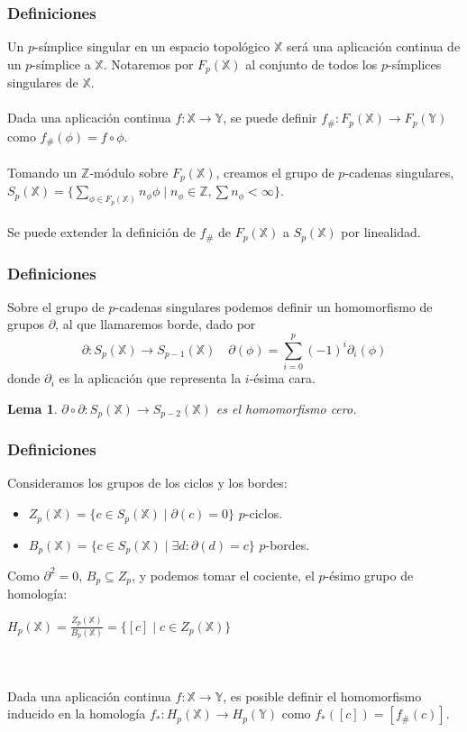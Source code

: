 \documentclass{beamer}
\def\X{{\mathbb X}}
\def\Y{{\mathbb Y}}
\theoremstyle{theorem}
\newtheorem{mylemma}{Lema}
\begin{document}

\begin{frame}
  \frametitle{Definiciones}
  Un $p$-símplice singular en un espacio topológico $\X$ será una aplicación continua de un $p$-símplice a $\X$.
  Notaremos por $F_p(\X)$ al conjunto de todos los $p$-símplices singulares de $\X$. \\~\\

  Dada una aplicación continua $f \colon \X \to \Y$, se puede definir $f_\# \colon F_p(\X) \to F_p(\Y)$ como
  $f_\#(\phi) = f \circ \phi$. \\~\\

  Tomando un $\mathbb{Z}$-módulo sobre $F_p(\X)$, creamos el grupo de $p$-cadenas singulares,
  $S_p(\X) = \{\sum\limits_{\phi \in F_p(\X)} n_{\phi} \phi \mid n_{\phi} \in \mathbb Z,  \sum n_\phi < \infty\}$.
  \\~\\

  Se puede extender la definición de $f_\#$ de $F_p(\X)$ a $S_p(\X)$ por linealidad.


\end{frame}

\begin{frame}
  \frametitle{Definiciones}
  Sobre el grupo de $p$-cadenas singulares podemos definir un homomorfismo de grupos $\partial$, al que llamaremos borde, dado por
  \[ \partial \colon S_p(\X) \to S_{p-1}(\X) \quad \partial(\phi) = \sum\limits_{i = 0}^p (-1)^i \partial_i(\phi) \]
  donde $\partial_i$ es la aplicación que representa la $i$-ésima cara.

  \begin{mylemma}
      $\partial \circ \partial \colon S_p(\X) \to S_{p-2}(\X)$ es el homomorfismo cero.
  \end{mylemma}

\end{frame}


\begin{frame}
  \frametitle{Definiciones}
  Consideramos los grupos de los ciclos y los bordes:
  \begin{itemize}
    \item $Z_p(\X) = \{c \in S_p(\X) \mid \partial(c) = 0\}$ $p$-ciclos.
    \item $B_p(\X) = \{c \in S_p(\X) \mid \exists d \colon \partial(d) = c\}$ $p$-bordes.
  \end{itemize}

  Como $\partial^2 = 0$, $B_p \subseteq Z_p$, y podemos tomar el cociente, el $p$-ésimo grupo de homología:
  \centerline{$H_p(\X) = \frac{Z_p(\X)}{B_p(\X)} = \{[c] \mid c \in Z_p(\X)\}$} \\~\\

  Dada una aplicación continua $f \colon \X \to \Y$, es posible definir el homomorfismo inducido en
  la homología $f_* \colon H_p(\X) \to H_p(\Y)$ como $f_*([c]) = [f_\#(c)]$.

\end{frame}
\end{document}
